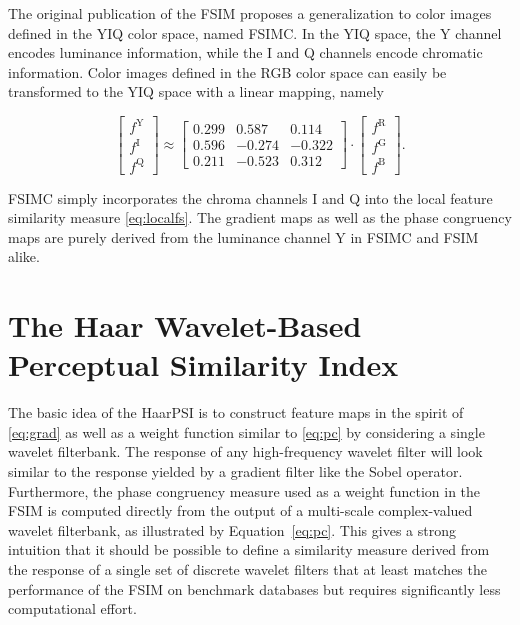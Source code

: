 \documentclass[11pt,a4paper]{article}
\begin{document}
The original publication of the FSIM proposes a generalization to color images defined in the YIQ color space, named FSIMC. In the YIQ space, the Y channel encodes luminance information, while the I and Q channels encode chromatic information. Color images defined in the RGB color space can easily be transformed to the YIQ space with a linear mapping, namely

\begin{equation}
\begin{bmatrix} f^{\text{Y}} \\ f^{\text{I}} \\ f^{\text{Q}} \end{bmatrix}
\approx
\begin{bmatrix} 0.299 & 0.587 & 0.114 \\ 0.596 & -0.274 & -0.322 \\ 0.211 & -0.523 & 0.312 \end{bmatrix}\cdot
\begin{bmatrix} f^{\text{R}} \\ f^{\text{G}} \\ f^{\text{B}} \end{bmatrix}.
\end{equation}

FSIMC simply incorporates the chroma channels I and Q into the local feature similarity measure \eqref{eq:localfs}. The gradient maps as well as the phase congruency maps are purely derived from the luminance channel Y in FSIMC and FSIM alike. 






\section{The Haar Wavelet-Based Perceptual Similarity Index}
\label{sec:HaarPSI}

The basic idea of the HaarPSI is to construct feature maps in the spirit of \eqref{eq:grad} as well as a weight function similar to \eqref{eq:pc} by considering a single wavelet filterbank. The response of any high-frequency wavelet filter will look similar to the response yielded by a gradient filter like the Sobel operator. Furthermore, the phase congruency measure used as a weight function in the FSIM is computed directly from the output of a multi-scale complex-valued wavelet filterbank, as illustrated by Equation~\eqref{eq:pc}. This gives a strong intuition that it should be possible to define a similarity measure derived from the response of a single set of discrete wavelet filters that at least matches the performance of the FSIM on benchmark databases but requires significantly less computational effort.
\end{document}
